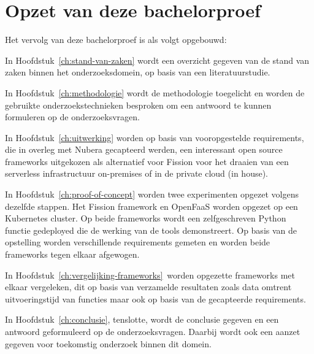 \section{Opzet van deze bachelorproef}
\label{sec:opzet-bachelorproef}

Het vervolg van deze bachelorproef is als volgt opgebouwd:

In Hoofdstuk~\ref{ch:stand-van-zaken} wordt een overzicht gegeven van de stand van zaken binnen het onderzoeksdomein, op basis van een literatuurstudie.

In Hoofdstuk~\ref{ch:methodologie} wordt de methodologie toegelicht en worden de gebruikte onderzoekstechnieken besproken om een antwoord te kunnen formuleren op de onderzoeksvragen.

In Hoofdstuk~\ref{ch:uitwerking} worden op basis van vooropgestelde requirements, die in overleg met Nubera gecapteerd werden, een interessant open source frameworks uitgekozen als alternatief voor Fission voor het draaien van een serverless infrastructuur on-premises of in de private cloud (in house).

In Hoofdstuk~\ref{ch:proof-of-concept} worden twee experimenten opgezet volgens dezelfde stappen. Het Fission framework en OpenFaaS worden opgezet op een Kubernetes cluster. Op beide frameworks wordt een zelfgeschreven Python functie gedeployed die de werking van de tools demonstreert. Op basis van de opstelling worden verschillende requirements gemeten en worden beide frameworks tegen elkaar afgewogen.

In Hoofdstuk~\ref{ch:vergelijking-frameworks} worden opgezette frameworks met elkaar vergeleken, dit op basis van verzamelde resultaten zoals data omtrent uitvoeringstijd van functies maar ook op basis van de gecapteerde requirements.

In Hoofdstuk~\ref{ch:conclusie}, tenslotte, wordt de conclusie gegeven en een antwoord geformuleerd op de onderzoeksvragen. Daarbij wordt ook een aanzet gegeven voor toekomstig onderzoek binnen dit domein.

